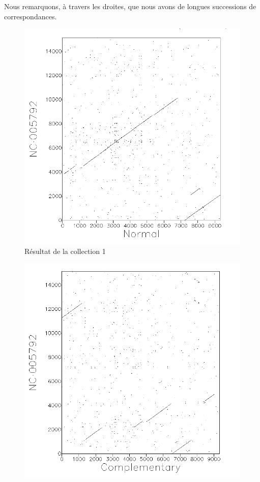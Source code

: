 Nous remarquons, à travers les droites, que nous avons de longues successions de
correspondances.

\begin{figure}[!ht]
	\begin{minipage}[r]{.46\linewidth}
		\begin{center}
		\includegraphics[scale= 0.4]{../res/cible1.png}
		Résultat de la collection 1
	\end{center}
\end{minipage} \hfill
\begin{minipage}[c]{.46 \linewidth}
	\begin{center}
			\includegraphics[scale= 0.4]{../res/cible1-ic.png}

\end{center}
\end{minipage}
\end{figure}
